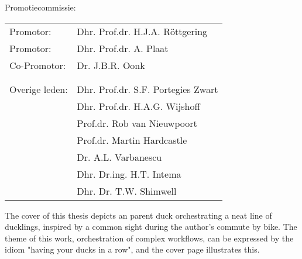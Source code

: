 

Promotiecommissie:



\begin{tabular}{ll}
    Promotor: &Dhr. Prof.dr. H.J.A. R{\"o}ttgering \\

Promotor: &Dhr. Prof.dr. A. Plaat \\

Co-Promotor: &Dr. J.B.R. Oonk \\

\\

\\

Overige leden: &Dhr. Prof.dr. S.F. Portegies Zwart\\

    &Dhr. Prof.dr. H.A.G. Wijshoff \\
    
    &Prof.dr. Rob van Nieuwpoort \\
    
    &Prof.dr. Martin Hardcastle \\
    
    &Dr. A.L. Varbanescu\\

    &Dhr. Dr.ing. H.T. Intema\\
    
    & Dhr. Dr. T.W. Shimwell\\

\end{tabular}


\vskip 3.0in

The cover of this thesis depicts an parent duck orchestrating a neat line of ducklings, inspired by a common sight during the author's commute by bike. The theme of this work, orchestration of complex workflows, can be expressed by the idiom "having your ducks in a row", and the cover page illustrates this.
